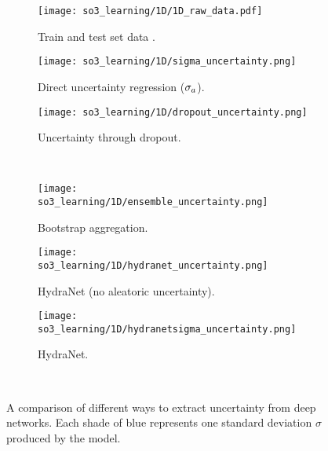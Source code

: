 \begin{figure*}[h!]
	\centering
	\begin{subfigure}[]{0.32\textwidth}
		\texttt{[image: so3\_learning/1D/1D\_raw\_data.pdf]}
		\caption{Train and test set data .}
		\label{fig:1D_rawdata}
	\end{subfigure}
	\hfill
	\begin{subfigure}[]{0.32\textwidth}
		\texttt{[image: so3\_learning/1D/sigma\_uncertainty.png]}
		\caption{Direct uncertainty regression ($\sigma_a$).}
		\label{fig:1D_sigma}
	\end{subfigure}
	\hfill
	\begin{subfigure}[]{0.32\textwidth} 
		\texttt{[image: so3\_learning/1D/dropout\_uncertainty.png]}
		\caption{Uncertainty through dropout.}
		\label{fig:1D_dropout}
	\end{subfigure} \\	
	\begin{subfigure}[]{0.32\textwidth}
	\texttt{[image: so3\_learning/1D/ensemble\_uncertainty.png]}
	\caption{Bootstrap aggregation.}
	\label{fig:1D_ensemble}
	\end{subfigure}
	\hfill
	\begin{subfigure}[]{0.32\textwidth}
		\texttt{[image: so3\_learning/1D/hydranet\_uncertainty.png]}
		\caption{HydraNet (no aleatoric uncertainty).}
		\label{fig:1D_hydra}
	\end{subfigure}
	\hfill
	\begin{subfigure}[]{0.32\textwidth} 
		\texttt{[image: so3\_learning/1D/hydranetsigma\_uncertainty.png]}
		\caption{HydraNet.}
		\label{fig:1D_hydrasigma}
	\end{subfigure} \\
		\caption{A comparison of different ways to extract uncertainty from deep networks. Each shade of blue represents one standard deviation $\sigma$ produced by the model.}
		\label{fig:1d_uncertainty}
\end{figure*}

